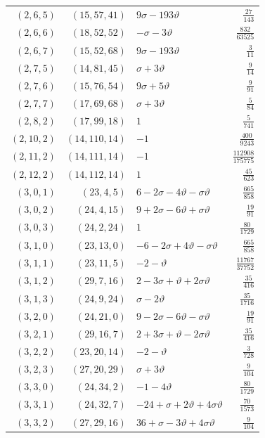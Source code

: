 \begin{longtable}{rrlr}
$(2,6,5)$ & $(15,57,41)$ & $9\sigma-193\vartheta$ & $\frac{27}{143}$\\
$(2,6,6)$ & $(18,52,52)$ & $-\sigma-3\vartheta$ & $\frac{832}{63525}$\\
$(2,6,7)$ & $(15,52,68)$ & $9\sigma-193\vartheta$ & $\frac{3}{11}$\\
$(2,7,5)$ & $(14,81,45)$ & $\sigma+3\vartheta$ & $\frac{9}{14}$\\
$(2,7,6)$ & $(15,76,54)$ & $9\sigma+5\vartheta$ & $\frac{9}{91}$\\
$(2,7,7)$ & $(17,69,68)$ & $\sigma+3\vartheta$ & $\frac{5}{84}$\\
$(2,8,2)$ & $(17,99,18)$ & $1$ & $\frac{5}{741}$\\
$(2,10,2)$ & $(14,110,14)$ & $-1$ & $\frac{400}{9243}$\\
$(2,11,2)$ & $(14,111,14)$ & $-1$ & $\frac{112908}{175775}$\\
$(2,12,2)$ & $(14,112,14)$ & $1$ & $\frac{45}{623}$\\
$(3,0,1)$ & $(23,4,5)$ & $6-2\sigma-4\vartheta-\sigma\vartheta$ & $\frac{665}{858}$\\
$(3,0,2)$ & $(24,4,15)$ & $9+2\sigma-6\vartheta+\sigma\vartheta$ & $\frac{19}{91}$\\
$(3,0,3)$ & $(24,2,24)$ & $1$ & $\frac{80}{1729}$\\
$(3,1,0)$ & $(23,13,0)$ & $-6-2\sigma+4\vartheta-\sigma\vartheta$ & $\frac{665}{858}$\\
$(3,1,1)$ & $(23,11,5)$ & $-2-\vartheta$ & $\frac{11767}{37752}$\\
$(3,1,2)$ & $(29,7,16)$ & $2-3\sigma+\vartheta+2\sigma\vartheta$ & $\frac{35}{416}$\\
$(3,1,3)$ & $(24,9,24)$ & $\sigma-2\vartheta$ & $\frac{35}{1716}$\\
$(3,2,0)$ & $(24,21,0)$ & $9-2\sigma-6\vartheta-\sigma\vartheta$ & $\frac{19}{91}$\\
$(3,2,1)$ & $(29,16,7)$ & $2+3\sigma+\vartheta-2\sigma\vartheta$ & $\frac{35}{416}$\\
$(3,2,2)$ & $(23,20,14)$ & $-2-\vartheta$ & $\frac{3}{728}$\\
$(3,2,3)$ & $(27,20,29)$ & $\sigma+3\vartheta$ & $\frac{9}{104}$\\
$(3,3,0)$ & $(24,34,2)$ & $-1-4\vartheta$ & $\frac{80}{1729}$\\
$(3,3,1)$ & $(24,32,7)$ & $-24+\sigma+2\vartheta+4\sigma\vartheta$ & $\frac{70}{1573}$\\
$(3,3,2)$ & $(27,29,16)$ & $36+\sigma-3\vartheta+4\sigma\vartheta$ & $\frac{9}{104}$\\

\end{longtable}
